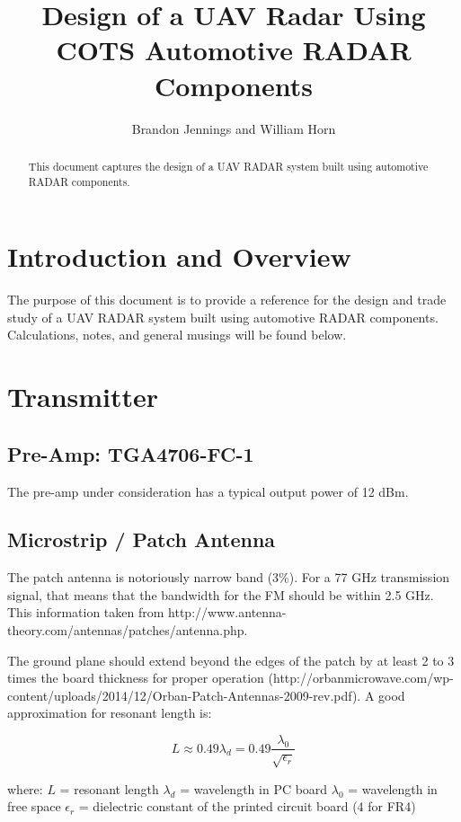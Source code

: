 \documentclass[]{article}
\title{Design of a UAV Radar Using COTS Automotive RADAR Components}
\author{Brandon Jennings and William Horn}
\begin{document}
\maketitle

\begin{abstract}
This document captures the design of a UAV RADAR system built using automotive RADAR components.
\end{abstract}

\section{Introduction and Overview}
The purpose of this document is to provide a reference for the design and trade study of a UAV RADAR system built using automotive RADAR components. Calculations, notes, and general musings will be found below.

\section{Transmitter}

\subsection{Pre-Amp: TGA4706-FC-1}
The pre-amp under consideration has a typical output power of 12 dBm.

\subsection{Microstrip / Patch Antenna}

The patch antenna is notoriously narrow band (3\%). For a 77 GHz transmission signal, that means that the bandwidth for the FM should be within 2.5 GHz. This information taken from http://www.antenna-theory.com/antennas/patches/antenna.php. 

The ground plane should extend beyond the edges of the patch by at least 2 to 3 times the board thickness for proper operation (http://orbanmicrowave.com/wp-content/uploads/2014/12/Orban-Patch-Antennas-2009-rev.pdf). A good approximation for resonant length is:

\begin{equation}
L \approx 0.49 \lambda_{d} = 0.49 \frac{\lambda_{0}}{\sqrt{\epsilon_{r}}}
\end{equation}

\noindent  where: \newline
$ L $ = resonant length \newline
$ \lambda_{d} $ = wavelength in PC board \newline
$ \lambda_{0} $ = wavelength in free space \newline
$ \epsilon_{r} $ = dielectric constant of the printed circuit board (4 for FR4)
\end{document}
